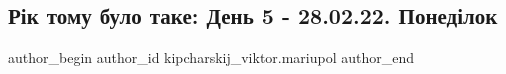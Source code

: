  
 
 
 
 

\subsection{Рік тому  було таке:  День 5 - 28.02.22. Понеділок}
\label{sec:28_02_2023.fb.kipcharskij_viktor.mariupol.1.r_k_tomu__bulo_take_}

\ifcmt
 author_begin
   author_id kipcharskij_viktor.mariupol
 author_end
\fi

